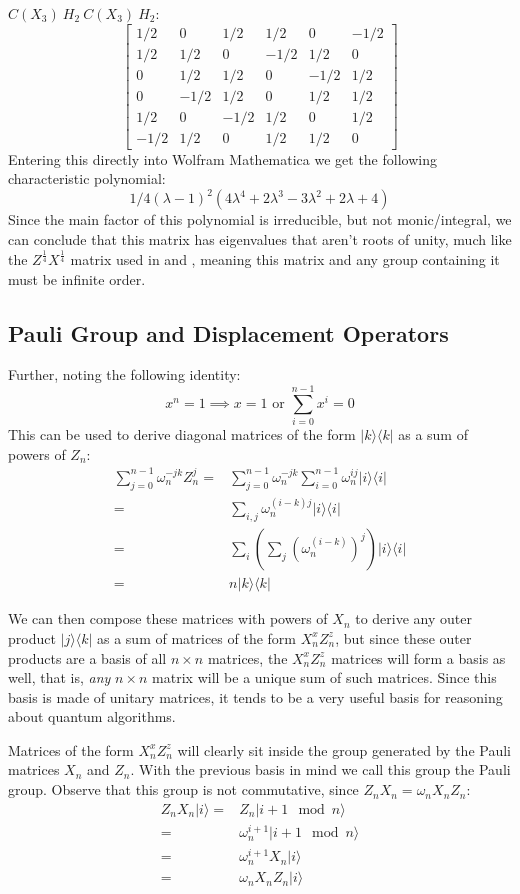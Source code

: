 \documentclass[]{article}
\newcommand{\bra}[1]{\langle #1 |}
\newcommand{\ket}[1]{| #1 \rangle}
\begin{document}
$C(X_3)\ H_2\ C(X_3)\ H_2$:
\[\left[\begin{matrix}
	1/2 & 0 & 1/2 & 1/2 & 0 & -1/2\\
	1/2 & 1/2 & 0 & -1/2 & 1/2 & 0\\
	0 & 1/2 & 1/2 & 0 & -1/2 & 1/2\\
	0 & -1/2 & 1/2 & 0 & 1/2 & 1/2\\
	1/2 & 0 & -1/2 & 1/2 & 0 & 1/2\\
	-1/2 & 1/2 & 0 & 1/2 & 1/2 & 0
\end{matrix}\right]\]
Entering this directly into Wolfram Mathematica we get the following characteristic polynomial:
\[1/4 (\lambda - 1)^2 (4 \lambda^4 + 2 \lambda^3 - 3 \lambda^2 + 2 \lambda + 4)\]
Since the main factor of this polynomial is irreducible, but not monic/integral, we can conclude that this matrix has eigenvalues that aren't roots of unity, much like the $Z^{\frac{1}{4}}X^{\frac{1}{4}}$ matrix used in \cite{universal-qubit} and \cite{algos}, meaning this matrix and any group containing it must be infinite order.

\subsection{Pauli Group and Displacement Operators}
 Further, noting the following identity:
\[x^n=1 \implies x = 1 \text{\ or\ } \sum_{i=0}^{n-1}x^i = 0\]
This can be used to derive diagonal matrices of the form $\ket{k}\bra{k}$ as a sum of powers of $Z_n$:
\begin{align*}
	\sum_{j=0}^{n-1} \omega_n^{-jk}Z_n^j
	=& \sum_{j=0}^{n-1}\omega_n^{-jk} \sum_{i=0}^{n-1}\omega_n^{ij}\ket{i}\bra{i}
	\\=& \sum_{i,j} \omega_n^{(i-k)j}\ket{i}\bra{i}
	\\=& \sum_{i} \left(\sum_j \left(\omega_n^{(i-k)}\right)^j\right)\ket{i}\bra{i}
	\\=& n\ket{k}\bra{k}
\end{align*}

We can then compose these matrices with powers of $X_n$ to derive any outer product $\ket{j}\bra{k}$ as a sum of matrices of the form $X_n^xZ_n^z$, but since these outer products are a basis of all $n\times n$ matrices, the $X_n^xZ_n^z$ matrices will form a basis as well, that is, \textit{any} $n\times n$ matrix will be a unique sum of such matrices. Since this basis is made of unitary matrices, it tends to be a very useful basis for reasoning about quantum algorithms.


Matrices of the form $X_n^xZ_n^z$ will clearly sit inside the group generated by the Pauli matrices $X_n$ and $Z_n$. With the previous basis in mind we call this group the Pauli group. Observe that this group is not commutative, since $Z_nX_n = \omega_nX_nZ_n$:
\begin{align*}
	Z_nX_n\ket{i}
	=& Z_n\ket{i+1\mod n}
	\\=& \omega_n^{i+1}\ket{i+1\mod n}
	\\=& \omega_n^{i+1}X_n\ket{i}
	\\=& \omega_nX_nZ_n\ket{i}
\end{align*}
\end{document}
